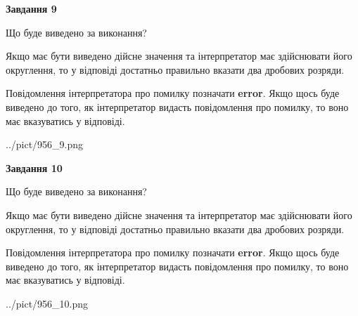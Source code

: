 \documentclass[12pt, ukrainian]{article}
\begin{document}
{\begin {Large}
{\begin {center}\textbf{Завдання 9}\end {center}}\par
Що буде виведено за виконання? \par

Якщо має бути виведено дійсне значення та інтерпретатор має здійснювати його округлення, 
то у відповіді достатньо правильно вказати два дробових розряди.

Повідомлення інтерпретатора про помилку позначати \textbf{error}.
Якщо щось буде виведено до того, як інтерпретатор видасть повідомлення про помилку, 
то воно має вказуватись у відповіді. \par

\begin{center}
	{../pict/956_9.png}
\end{center}
\newpage

{\begin {center}\textbf{Завдання 10}\end {center}}\par
Що буде виведено за виконання? \par

Якщо має бути виведено дійсне значення та інтерпретатор має здійснювати його округлення, 
то у відповіді достатньо правильно вказати два дробових розряди.

Повідомлення інтерпретатора про помилку позначати \textbf{error}.
Якщо щось буде виведено до того, як інтерпретатор видасть повідомлення про помилку, 
то воно має вказуватись у відповіді. \par

\begin{center}
	{../pict/956_10.png}
\end{center}
\newpage

\end {Large}}
\end{document}
